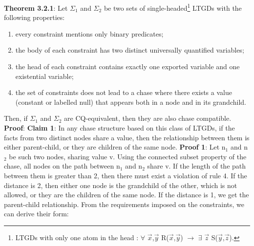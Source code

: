 \documentclass[11pt, a4paper, dvipsnames]{article}
\begin{document}
\textbf{Theorem 3.2.1}: Let $\Sigma_{1}$ and $\Sigma_{2}$ be two sets of single-headed\footnote{LTGDs with only one atom in the head : $\forall$ $\vec{x}$,$\vec{y}$ R($\vec{x}$,$\vec{y}$) $\rightarrow$ $\exists$ $\vec{z}$ S($\vec{y}$,$\vec{z}$).} LTGDs with the following properties:
\begin{enumerate}
	\item every constraint mentions only binary predicates;
	\item the body of each constraint has two distinct universally quantified variables;
	\item the head of each constraint contains exactly one exported variable and one existential variable;
	\item the set of constraints does not lead to a chase where there exists a value (constant or labelled null) that appears both in a node and in its grandchild.
\end{enumerate}
Then, if $\Sigma_{1}$ and $\Sigma_{2}$ are CQ-equivalent, then they are also chase compatible.\newline
\textbf{Proof}: \newline
\textbf{Claim 1}: In any chase structure based on this class of LTGDs, if the facts from two distinct nodes share a value, then the relationship between them is either parent-child, or they are children of the same node.\newline
\textbf{Proof 1}: Let n$_{1}$ and n$_{2}$ be such two nodes, sharing value v. Using the connected subset property of the chase, all nodes on the path between n$_{1}$ and n$_{2}$ share v. If the length of the path between them is greater than 2, then there must exist a violation of rule 4. If the distance is 2, then either one node is the grandchild of the other, which is not allowed, or they are the children of the same node. If the distance is 1, we get the parent-child relationship.\newline
From the requirements imposed on the constraints, we can derive their form:
\end{document}
